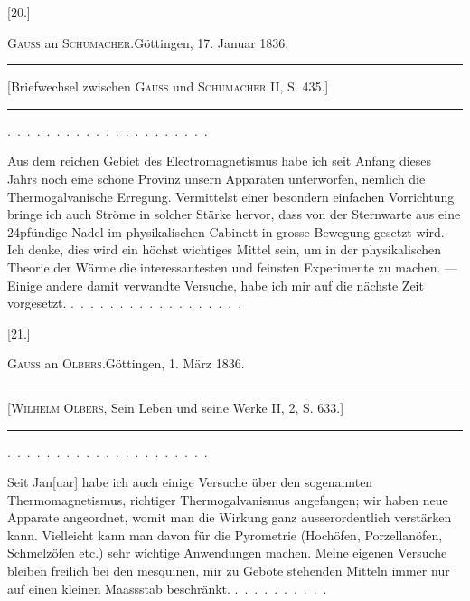 \clearpage\begingroup{}
\begin{center}[20.]\end{center}
\begin{center}\textsc{Gauss} an \textsc{Schumacher}.\quad Göttingen, 17. Januar 1836.\end{center}
\begin{center}\begin{minipage}{.82\linewidth}\centering\hrule\vspace{3pt}
\small [Briefwechsel zwischen \textsc{Gauss} und \textsc{Schumacher} II, S. 435.]
\par\vspace{3pt}\hrule\end{minipage}\end{center}
\noindent .\ .\ .\ .\ .\ .\ .\ .\ .\ .\ .\ .\ .\ .\ .\ .\ .\ .\ .\ .\ .\par
\indent Aus dem reichen Gebiet des Electromagnetismus habe ich seit Anfang
dieses Jahrs noch eine schöne Provinz unsern Apparaten unterworfen, nemlich
die Thermogalvanische Erregung. Vermittelst einer besondern einfachen Vorrichtung
bringe ich auch  Ströme in solcher Stärke hervor, dass von
der Sternwarte aus eine 24pfündige Nadel im physikalischen Cabinett in grosse
Bewegung gesetzt wird. Ich denke, dies wird ein höchst wichtiges Mittel sein,
um in der physikalischen Theorie der Wärme die interessantesten und feinsten
Experimente zu machen. — Einige andere damit verwandte Versuche, habe
ich mir auf die nächste Zeit vorgesetzt. \mbox{.\ .\ .\ .\ .\ .\ .\ .\ .\ .\ .\ .\ .\ .\ .\ .\ .\ .}

\bigskip{}
\begin{center}[21.]\end{center}
\begin{center}\textsc{Gauss} an \textsc{Olbers}.\quad Göttingen, 1. März 1836.\end{center}
\begin{center}\begin{minipage}{.88\linewidth}\centering\hrule\vspace{3pt}
\small [\textsc{Wilhelm Olbers}, Sein Leben und seine Werke II, 2, S. 633.]
\par\vspace{3pt}\hrule\end{minipage}\end{center}
\noindent .\ .\ .\ .\ .\ .\ .\ .\ .\ .\ .\ .\ .\ .\ .\ .\ .\ .\ .\ .\ .\par
\indent Seit Jan[uar] habe ich auch einige Versuche über den sogenannten Thermomagnetismus,
richtiger Thermogalvanismus angefangen; wir haben neue
Apparate angeordnet, womit man die Wirkung ganz ausserordentlich verstärken
kann. Vielleicht kann man davon für die Pyrometrie (Hochöfen,
Porzellanöfen, Schmelzöfen etc.) sehr wichtige Anwendungen machen. Meine
eigenen Versuche bleiben freilich bei den mesquinen, mir zu Gebote stehenden
Mitteln immer nur auf einen kleinen Maassstab beschränkt. \mbox{.\ .\ .\ .\ .\ .\ .\ .\ .\ .}
\clearpage\endgroup
